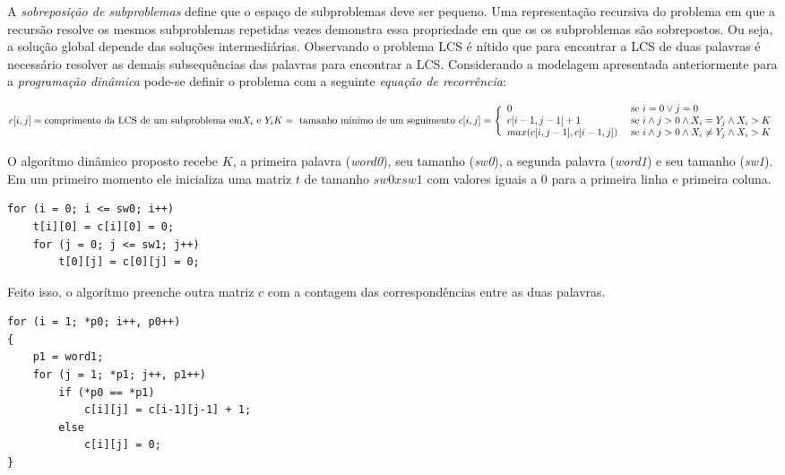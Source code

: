 A \emph{sobreposição de subproblemas} define que o espaço de subproblemas
deve ser pequeno. Uma representação recursiva do problema em que a recursão
resolve os mesmos subproblemas repetidas vezes demonstra essa propriedade
em que os os subproblemas são sobrepostos. Ou seja, a solução global 
depende das soluções intermediárias. Observando o problema LCS é nítido
que para encontrar a LCS de duas palavras é necessário resolver as demais
subsequências das palavras para encontrar a LCS. Considerando a modelagem 
apresentada anteriormente para a \emph{programação dinâmica} pode-se definir 
o problema com a seguinte \emph{equação de recorrência}:

\begin{math}
    c[i,j] = \textnormal{comprimento da LCS de um subproblema em} 
    X_i \textnormal{ e } Y_i \\
    K = \textnormal{ tamanho mínimo de um seguimento } \\ \\
    c[i,j] = \Bigg\{
        \begin{array}{l l}
            0 & \textnormal{ se } i = 0 \vee j = 0 \\
            c[i-1,j-1] + 1 & \textnormal{ se } i \wedge j > 0 \wedge
            X_i = Y_j \wedge X_i > K \\
            max(c[i,j-1], c[i-1,j]) & \textnormal{ se } i \wedge 
            j > 0 \wedge X_i \ne Y_j \wedge X_i > K 
        \end{array}
\end{math}

O algorítmo dinâmico proposto recebe $K$, a primeira palavra (\emph{word0}),
seu tamanho (\emph{sw0}), a segunda palavra (\emph{word1}) e seu tamanho
(\emph{sw1}). Em um primeiro momento ele inicializa uma matriz $t$ de tamanho
$sw0 x sw1$ com valores iguais a $0$ para a primeira linha e primeira 
coluna. 

\begin{lstlisting}
for (i = 0; i <= sw0; i++)
    t[i][0] = c[i][0] = 0;
    for (j = 0; j <= sw1; j++)
        t[0][j] = c[0][j] = 0;
\end{lstlisting}

Feito isso, o algorítmo preenche outra matriz $c$ com a contagem das 
correspondências entre as duas palavras. 

\begin{lstlisting}
for (i = 1; *p0; i++, p0++) 
{
    p1 = word1;
    for (j = 1; *p1; j++, p1++)
        if (*p0 == *p1)
            c[i][j] = c[i-1][j-1] + 1;
        else
            c[i][j] = 0;
}
\end{lstlisting}

